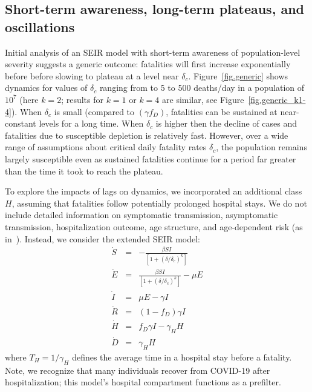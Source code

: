 \subsection{Short-term awareness, long-term plateaus, and oscillations}
Initial analysis of an SEIR model with short-term 
awareness of population-level severity suggests a generic outcome: 
fatalities will first increase exponentially before before slowing to plateau at a level near $\delta_c$.
Figure~\ref{fig.generic} shows dynamics for values of $\delta_c$ ranging 
from to 5 to 500 deaths/day in a population of $10^7$
(here $k=2$; results for $k=1$ or $k=4$ are similar, see Figure~\ref{fig.generic_k1-4}).
When $\delta_c$ is small (compared to $(\gamma f_D)$, fatalities can be sustained at near-constant levels for a long time.
When $\delta_c$ is higher then the decline of cases and fatalities due to susceptible depletion is relatively fast.
However, over a wide range of assumptions about critical daily fatality rates $\delta_c$, the population remains largely susceptible even as sustained fatalities continue for a period far greater than
the time it took to reach the plateau.

To explore the impacts of lags on dynamics,
we incorporated an additional class $H$,
assuming that fatalities follow potentially prolonged
hospital stays.  We do not include 
detailed information on symptomatic transmission, asymptomatic
transmission, hospitalization outcome,
age structure, and age-dependent risk (as in~\citep{ferguson2020report}). 
Instead, we consider the extended SEIR model:
\begin{eqnarray}
\dot{S} &=& -\frac{\beta SI}{\left[1+\left(\delta/\delta_c\right)^{k}\right]}\\
\dot{E} &=& \frac{\beta SI}{\left[1+\left(\delta/\delta_c\right)^{k}\right]}-\mu E\\
\dot{I} &=& \mu E-\gamma I \\
\dot{R} &=& (1-f_D)\gamma I\\
\dot{H} &=& f_D\gamma I - \gamma_H H\\
\dot{D} &=& \gamma_H H
\end{eqnarray}
where $T_H=1/\gamma_H$ defines the average time in a hospital
stay before a fatality. Note, we recognize that many individuals
recover from COVID-19 after hospitalization; this model's hospital
compartment functions as a prefilter.  

